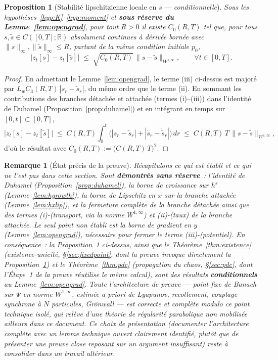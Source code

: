 \documentclass[11pt,a4paper]{article}
\newcommand{\R}{\mathbb{R}}
\theoremstyle{plain}
\newtheorem*{remark*}{Remarque}
\newtheorem{prop}[thm]{Proposition}
\theoremstyle{definition}
\begin{document}
\begin{prop}[Stabilit\'e lipschitzienne locale en $s$ --- \emph{conditionnelle}]
\label{lem:lipschitz-s}
Sous les hypoth\`eses~\ref{hyp:K}--\ref{hyp:moment} et \textbf{sous r\'eserve du Lemme~\ref{lem:opengrad}}, pour tout $R>0$ il existe $C_0(R,T)$ tel que, pour tous $s,\tilde s\in C([0,T];\R)$ absolument continues \`a d\'eriv\'ee born\'ee avec $\|s\|_\infty,\|\tilde s\|_\infty\le R$, partant de la m\^eme condition initiale $p_0$,
\[
\big|z_t[s]-z_t[\tilde s]\big| \;\le\; \sqrt{C_0(R,T)}\,\|s-\tilde s\|_{W^{1,\infty}}, \qquad \forall t\in[0,T].
\]
\end{prop}
\begin{proof}
En admettant le Lemme~\ref{lem:opengrad}, le terme (iii) ci-dessus est major\'e par $L_wC_3(R,T)\,|s_r-\tilde s_r|$, du m\^eme ordre que le terme (ii). En sommant les contributions des branches d\'etach\'ee et attach\'ee (termes (i)--(iii)) dans l'identit\'e de Duhamel (Proposition~\ref{prop:duhamel}) et en int\'egrant en temps sur $[0,t]\subset[0,T]$,
\[
\big|z_t[s]-z_t[\tilde s]\big| \;\le\; C(R,T)\int_0^t\big(|s_r-\tilde s_r|+|\dot s_r-\dot{\tilde s}_r|\big)\,dr \;\le\; C(R,T)\,T\,\|s-\tilde s\|_{W^{1,\infty}},
\]
d'o\`u le r\'esultat avec $C_0(R,T):=\big(C(R,T)\,T\big)^2$.
\end{proof}

\begin{remark*}[\'Etat pr\'ecis de la preuve]
\label{rem:status}
R\'ecapitulons ce qui est \'etabli et ce qui ne l'est pas dans cette section. Sont \textbf{d\'emontr\'es sans r\'eserve}~: l'identit\'e de Duhamel (Proposition~\ref{prop:duhamel}), la borne de croissance sur $h^s$ (Lemme~\ref{lem:hgrowth}), la borne de Lipschitz en $x$ sur la branche attach\'ee (Lemme~\ref{lem:hxlip}), et la fermeture compl\`ete de la branche d\'etach\'ee ainsi que des termes (i)-(transport, via la norme $W^{1,\infty}$) et (ii)-(taux) de la branche attach\'ee. Le seul point non \'etabli est la borne de gradient en $y$ (Lemme~\ref{lem:opengrad}), n\'ecessaire pour fermer le terme (iii)-(potentiel). En cons\'equence~: la Proposition~\ref{lem:lipschitz-s} ci-dessus, ainsi que le Th\'eor\`eme~\ref{thm:existence} (existence-unicit\'e, \S\ref{sec:fixedpoint}, dont la preuve invoque directement la Proposition~\ref{lem:lipschitz-s}) et le Th\'eor\`eme~\ref{thm:pdc} (propagation du chaos, \S\ref{sec:pdc}, dont l'\'Etape~1 de la preuve r\'eutilise le m\^eme calcul), sont des r\'esultats \textbf{conditionnels} au Lemme~\ref{lem:opengrad}. Toute l'architecture de preuve --- point fixe de Banach sur $\Psi$ en norme $W^{1,\infty}$, estim\'ee a priori de Lyapunov, recollement, couplage synchrone \`a $N$ particules, Gr\"onwall --- est correcte et compl\`ete \emph{modulo} ce point technique isol\'e, qui rel\`eve d'une th\'eorie de r\'egularit\'e parabolique non mobilis\'ee ailleurs dans ce document. Ce choix de pr\'esentation (documenter l'architecture compl\`ete avec un lemme technique ouvert clairement identifi\'e, plut\^ot que de pr\'esenter une preuve close reposant sur un argument insuffisant) reste \`a consolider dans un travail ult\'erieur.
\end{remark*}
\end{document}
